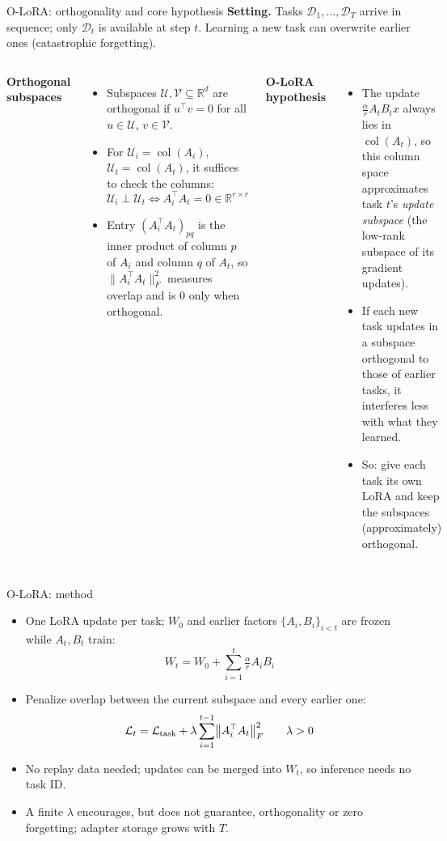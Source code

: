 \documentclass[aspectratio=169,10pt]{beamer}
\gdef\srctext{}
\newcommand{\src}[1]{\gdef\srctext{#1}}
\begin{document}
\begin{frame}{O-LoRA: orthogonality and core hypothesis}
	\small\textbf{Setting.} Tasks $\mathcal D_1,\dots,\mathcal D_T$ arrive in sequence; only $\mathcal D_t$ is available at step $t$. Learning a new task can overwrite earlier ones (catastrophic forgetting).
	\medskip
	\begin{columns}[T]
		\textbf{Orthogonal subspaces}
		\begin{itemize}
			\item Subspaces $\mathcal U,\mathcal V\subseteq\mathbb R^d$ are orthogonal if $u^\top v=0$ for all $u\in\mathcal U$, $v\in\mathcal V$.
			\item For $\mathcal U_i=\operatorname{col}(A_i)$, $\mathcal U_t=\operatorname{col}(A_t)$, it suffices to check the columns:
			      \[\mathcal U_i\perp\mathcal U_t\iff A_i^\top A_t=0\in\mathbb R^{r\times r}\]
			\item Entry $(A_i^\top A_t)_{pq}$ is the inner product of column $p$ of $A_i$ and column $q$ of $A_t$, so $\|A_i^\top A_t\|_F^2$ measures overlap and is $0$ only when orthogonal.
		\end{itemize}
		\textbf{O-LoRA hypothesis}
		\begin{itemize}
			\item The update $\tfrac{\alpha}{r}A_tB_tx$ always lies in $\operatorname{col}(A_t)$, so this column space approximates task $t$'s \emph{update subspace} (the low-rank subspace of its gradient updates).
			\item If each new task updates in a subspace orthogonal to those of earlier tasks, it interferes less with what they learned.
			\item So: give each task its own LoRA and keep the subspaces (approximately) orthogonal.
		\end{itemize}
	\end{columns}
	\src{Wang et al. (Findings of EMNLP 2023).}\end{frame}

\begin{frame}{O-LoRA: method}
	\small
	\begin{itemize}
		\item One LoRA update per task; $W_0$ and earlier factors $\{A_i,B_i\}_{i<t}$ are frozen while $A_t,B_t$ train:
		      \[W_t=W_0+\sum_{i=1}^{t}\tfrac{\alpha}{r}A_iB_i\]
		\item Penalize overlap between the current subspace and every earlier one:
		      \[\mathcal L_t=\mathcal L_{\rm task}+\lambda\sum_{i=1}^{t-1}\bigl\|A_i^\top A_t\bigr\|_F^2\qquad \lambda>0\]
		\item No replay data needed; updates can be merged into $W_t$, so inference needs no task ID.
		\item A finite $\lambda$ encourages, but does not guarantee, orthogonality or zero forgetting; adapter storage grows with $T$.
	\end{itemize}
	\src{Wang et al. (Findings of EMNLP 2023). Applied to attention query and value weights in the paper.}\end{frame}
\end{document}
